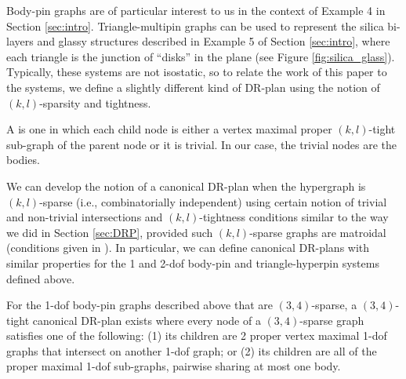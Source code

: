 Body-pin graphs are of particular interest to us in the context of Example 4 in Section \ref{sec:intro}. Triangle-multipin graphs can be used to represent the silica bi-layers and glassy structures described in Example 5 of Section \ref{sec:intro}, where each triangle is the junction of ``disks'' in the plane (see Figure \ref{fig:silica_glass}). Typically, these systems are not isostatic, so to relate the work of this paper to the systems, we define a slightly different kind of DR-plan using the notion of $(k,l)$-sparsity and tightness.

\begin{definition}
    A  is one in which each child node is either a vertex maximal proper $(k,l)$-tight sub-graph of the parent node or it is trivial. In our case, the trivial nodes are the bodies.
\end{definition}

We can develop the notion of a canonical DR-plan when the hypergraph is $(k,l)$-sparse (i.e., combinatorially independent) using certain notion of trivial and non-trivial intersections and $(k,l)$-tightness conditions similar to the way we did in Section \ref{sec:DRP}, provided such $(k,l)$-sparse graphs are matroidal (conditions given in \cite{Lee:2007:PGA}). In particular, we can define canonical DR-plans with similar properties for the 1 and 2-dof body-pin and triangle-hyperpin systems defined above.


\begin{observation*}
\label{obs:bodypin_drp}
    For the 1-dof body-pin graphs described above that are $(3,4)$-sparse, a $(3,4)$-tight canonical DR-plan exists where every node of a $(3,4)$-sparse graph satisfies one of the following: (1) its children are 2 proper vertex maximal 1-dof graphs that intersect on another 1-dof graph; or (2) its children are all of the proper maximal 1-dof sub-graphs, pairwise sharing at most one body.
\end{observation*}


